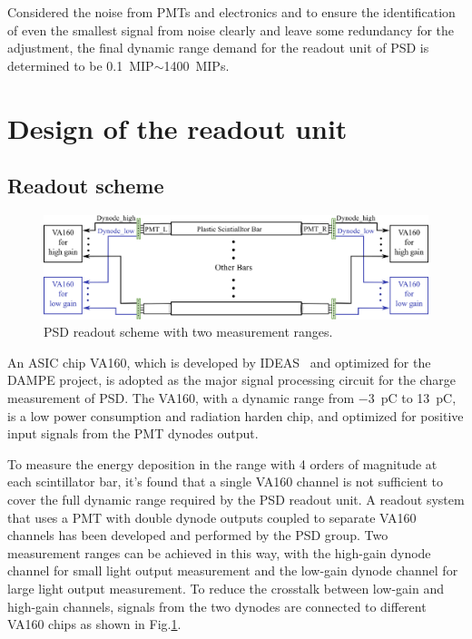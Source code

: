 \documentclass[preprint, times]{elsarticle}
\begin{document}
Considered the noise from PMTs and electronics and to ensure the identification of even the smallest signal from noise clearly and leave some redundancy for the adjustment, the final dynamic range demand for the readout unit of PSD is determined to be \SI{0.1}{MIP}$\sim$\SI{1400}{MIPs}.

\section{Design of the readout unit}
\label{sec:design}

\subsection{Readout scheme}
\label{sec:scheme}

\begin{figure}
\centering
 \includegraphics[width=140mm]{readout_scheme}
\caption{PSD readout scheme with two measurement ranges.}
\label{fig:readout_scheme}
\end{figure}


 An ASIC chip VA160, which is developed by IDEAS~\cite{va160} and optimized for the DAMPE project, is adopted as the major signal processing circuit for the charge measurement of PSD.
 The VA160, with a dynamic range from \SI{-3}{\pico\coulomb} to \SI{13}{\pico\coulomb}, is a low power consumption and radiation harden chip, and optimized for positive input signals from the PMT dynodes output.

To measure the energy deposition in the range with 4 orders of magnitude at each scintillator bar, it's found that a single VA160 channel is not sufficient to cover the full dynamic range required by the PSD readout unit. A readout system that uses a PMT with double dynode outputs coupled to separate VA160 channels has been developed and performed by the PSD group. Two measurement ranges can be achieved in this way, with the high-gain dynode channel for small light output measurement and the low-gain dynode channel for large light output measurement. To reduce the crosstalk between low-gain and high-gain channels, signals from the two dynodes are connected to different VA160 chips as shown in Fig.\ref{fig:readout_scheme}.
\end{document}
